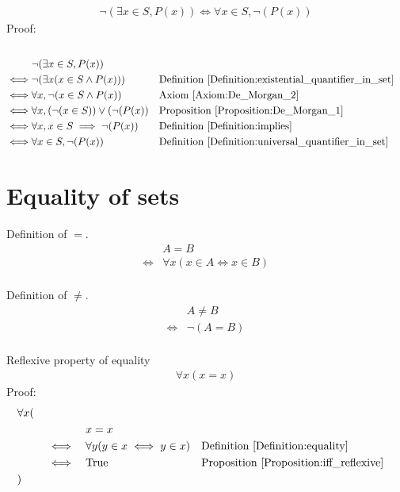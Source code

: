 \begin{prop}
\begin{align*}
\lnot (\exists x \in S, P(x)) \iff \forall x \in S, \lnot (P(x))
\end{align*}
Proof: \\ \\
\begin{align*}
& \lnot (\exists x \in S, P(x)) \\
\iff & \lnot ( \exists x (x \in S \land P(x)) )
&& \text{Definition \ref{Definition:existential_quantifier_in_set}} \\
\iff & \forall x, \lnot (x \in S \land P(x))
&& \text{Axiom \ref{Axiom:De_Morgan_2}} \\
\iff & \forall x, (\lnot(x \in S)) \lor (\lnot (P(x))
&& \text{Proposition \ref{Proposition:De_Morgan_1}} \\
\iff & \forall x, x \in S \implies \lnot (P(x))
&& \text{Definition \ref{Definition:implies}} \\
\iff & \forall x \in S, \lnot (P(x))
&& \text{Definition \ref{Definition:universal_quantifier_in_set}} \\
\end{align*}
\end{prop}

\section{Equality of sets}
\begin{defn}
\label{Definition:equality}
Definition of $=$.
\begin{align*}
& A = B \\
\iff & \forall x (x \in A \iff x \in B) \\
\end{align*}
\end{defn}

\begin{defn}
\label{Definition:neq}
Definition of $\neq$.
\begin{align*}
& A \neq B \\
\iff & \lnot (A = B) \\
\end{align*}
\end{defn}

\begin{prop}
Reflexive property of equality
\begin{align*}
\forall x (x = x)
\end{align*}
Proof:
\begin{align*}
& \forall x ( \\
& \quad &&  && x = x \\
& \quad && \iff && \forall y (y \in x \iff y \in x)
&& \text{Definition \ref{Definition:equality}} \\
& \quad && \iff && \text{True}
&& \text{Proposition \ref{Proposition:iff_reflexive}} \\
& )
\end{align*}
\end{prop}

